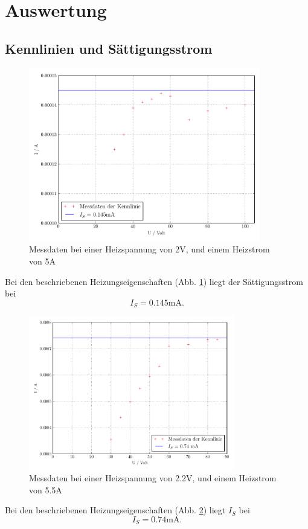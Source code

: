 \section{Auswertung}
\label{sec:Auswertung}


\subsection{Kennlinien und Sättigungsstrom}
\label{subsec:kennlinien}

\begin{figure}[H]
  \centering
  \includegraphics[width=0.9\textwidth]{build/Kennlinie1.pdf}
  \caption{Messdaten bei einer Heizspannung von 2V, und einem Heizstrom von 5A \cite{sample}}
  \label{fig:kenn1}
\end{figure}
Bei den beschriebenen Heizungseigenschaften (Abb. \ref{fig:kenn1}) liegt der Sättigungsstrom bei 
\begin{equation}
I_S = 0.145 \mathrm{mA}.
\label{eq:kenn1ergebnis}
\end{equation}


\begin{figure}[H]
  \centering
  \includegraphics[width=0.8\textwidth]{build/Kennlinie2.pdf}
  \caption{Messdaten bei einer Heizspannung von 2.2V, und einem Heizstrom von 5.5A \cite{sample}}
  \label{fig:kenn2}
\end{figure}
Bei den beschriebenen Heizungseigenschaften (Abb. \ref{fig:kenn2}) liegt $I_S$ bei 
\begin{equation}
I_S = 0.74 \mathrm{mA}.
\label{eq:kenn2ergebnis}
\end{equation}


